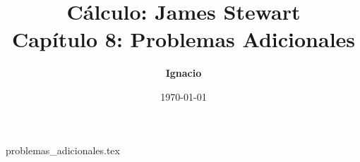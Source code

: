 \documentclass[11pt,spanish,oneside]{report}
\title{\textbf{Cálculo: James Stewart} \\ \Large Capítulo 8: Problemas Adicionales}
\author{\textbf{Ignacio}}
\date{\today}
\begin{document}
\maketitle

{problemas_adicionales.tex}
\end{document}
